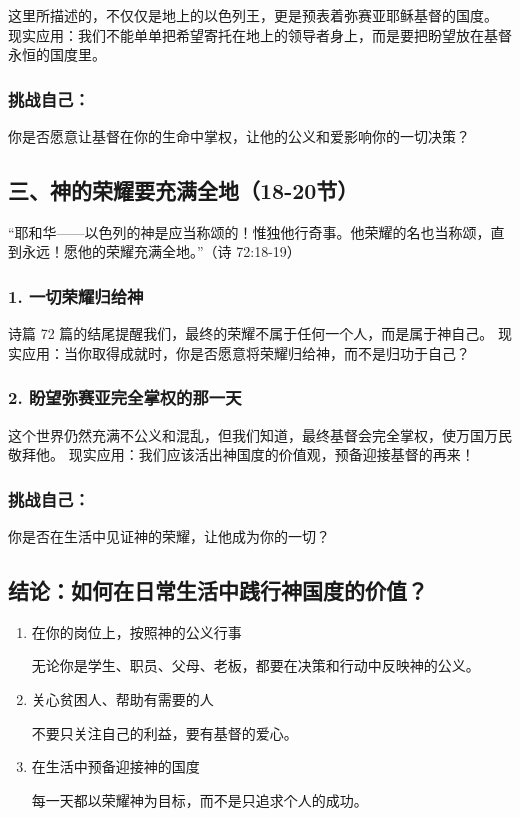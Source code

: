 \documentclass[a4paper, 12pt]{article}
\begin{document}
这里所描述的，不仅仅是地上的以色列王，更是预表着弥赛亚耶稣基督的国度。
现实应用：我们不能单单把希望寄托在地上的领导者身上，而是要把盼望放在基督永恒的国度里。
\subsubsection*{挑战自己：}

你是否愿意让基督在你的生命中掌权，让他的公义和爱影响你的一切决策？
\subsection*{三、神的荣耀要充满全地（18-20节）}
“耶和华——以色列的神是应当称颂的！惟独他行奇事。他荣耀的名也当称颂，直到永远！愿他的荣耀充满全地。”（诗 72:18-19）

\subsubsection*{1. 一切荣耀归给神}
诗篇 72 篇的结尾提醒我们，最终的荣耀不属于任何一个人，而是属于神自己。
现实应用：当你取得成就时，你是否愿意将荣耀归给神，而不是归功于自己？
\subsubsection*{2. 盼望弥赛亚完全掌权的那一天}
这个世界仍然充满不公义和混乱，但我们知道，最终基督会完全掌权，使万国万民敬拜他。
现实应用：我们应该活出神国度的价值观，预备迎接基督的再来！
\subsubsection*{挑战自己：}

你是否在生活中见证神的荣耀，让他成为你的一切？
\subsection*{结论：如何在日常生活中践行神国度的价值？}
\begin{enumerate}
    \item 在你的岗位上，按照神的公义行事
    
    无论你是学生、职员、父母、老板，都要在决策和行动中反映神的公义。

    \item 关心贫困人、帮助有需要的人
    
不要只关注自己的利益，要有基督的爱心。

    \item 在生活中预备迎接神的国度
    
每一天都以荣耀神为目标，而不是只追求个人的成功。

\end{enumerate}
\end{document}

